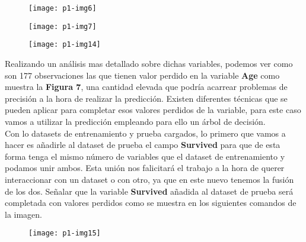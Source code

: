 \documentclass[10pt]{article}
\begin{document}
\begin{figure}[H]
	\begin{center}
 		\texttt{[image: p1-img6]}
	\end{center} 
\end{figure}

\begin{figure}[H]
	\begin{center}
 		\texttt{[image: p1-img7]}
	\end{center} 
\end{figure}

\begin{figure}[H]
	\begin{center}
 		\texttt{[image: p1-img14]}
	\end{center} 
\end{figure}

Realizando un análisis mas detallado sobre dichas variables, podemos ver como son 177 observaciones las que tienen valor perdido en la variable \textbf{Age} como muestra la \textbf{Figura 7}, una cantidad elevada que podría acarrear problemas de precisión a la hora de realizar la predicción. Existen diferentes técnicas que se pueden aplicar para completar esos valores perdidos de la variable, para este caso vamos a utilizar la predicción empleando para ello un árbol de decisión. \\

Con lo datasets de entrenamiento y prueba cargados, lo primero que vamos a hacer es añadirle al dataset de prueba el campo \textbf{Survived} para que de esta forma tenga el mismo número de variables que el dataset de entrenamiento y podamos unir ambos. Esta unión nos falicitará el trabajo a la hora de querer interaccionar con un dataset o con otro, ya que en este nuevo tenemos la fusión de los dos. Señalar que la variable \textbf{Survived} añadida al dataset de prueba será completada con valores perdidos como se muestra en los siguientes comandos de la imagen. \\

\begin{figure}[H]
	\begin{center}
 		\texttt{[image: p1-img15]}
	\end{center} 
\end{figure}
\end{document}
